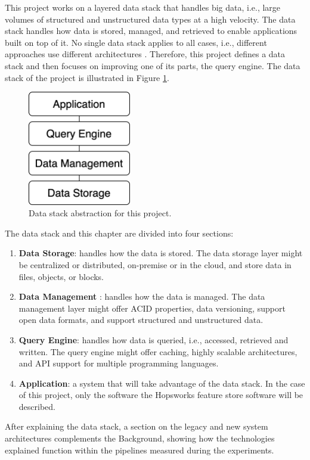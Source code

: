 This project works on a layered data stack that handles big data, i.e., large volumes of structured and unstructured data types at a high velocity. The data stack handles how data is stored, managed, and retrieved to enable applications built on top of it. 
No single data stack applies to all cases, i.e., different approaches use different architectures \cite{framptonCompleteGuideOpen2018,sakrBigDataProcessing2017}. Therefore, this project defines a data stack and then focuses on improving one of its parts, the query engine. The data stack of the project is illustrated in Figure \ref{fig:data_stack}.

\begin{figure}[!ht]
    \begin{center}
      \includegraphics[width=0.4\textwidth]{figures/2-background/data_stack.png}
    \end{center}
    \caption[Data stack abstraction]{Data stack abstraction for this project.}
    \label{fig:data_stack}
\end{figure}
The data stack and this chapter are divided into four sections:
\begin{enumerate}
    \item \textbf{Data Storage}: handles how the data is stored. The data storage layer might be centralized or distributed, on-premise or in the cloud, and store data in files, objects, or blocks.
    \item \textbf{Data Management} : handles how the data is managed. The data management layer might offer \gls{ACID} properties, data versioning, support open data formats, and support structured and unstructured data.
    \item \textbf{Query Engine}: handles how data is queried, i.e., accessed, retrieved and written. The query engine might offer caching, highly scalable architectures, and \gls{API} support for multiple programming languages.
    \item \textbf{Application}: a system that will take advantage of the data stack. In the case of this project, only the software the Hopsworks feature store software will be described. 
\end{enumerate}
After explaining the data stack, a section on the legacy and new system architectures complements the Background, showing how the technologies explained function within the pipelines measured during the experiments.
